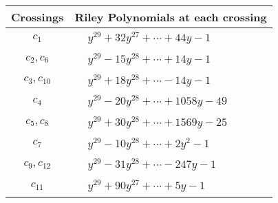 \documentclass[1p]{elsarticle_modified}
\theoremstyle{definition}
\begin{document}
\begin{tabular}{m{50pt}|m{274pt}}
Crossings & \hspace{64pt}Riley Polynomials at each crossing \\
\hline $$\begin{aligned}c_{1}\end{aligned}$$&$\begin{aligned}
&y^{29}+32 y^{27}+\cdots+44 y-1
\end{aligned}$\\
\hline $$\begin{aligned}c_{2},c_{6}\end{aligned}$$&$\begin{aligned}
&y^{29}-15 y^{28}+\cdots+14 y-1
\end{aligned}$\\
\hline $$\begin{aligned}c_{3},c_{10}\end{aligned}$$&$\begin{aligned}
&y^{29}+18 y^{28}+\cdots-14 y-1
\end{aligned}$\\
\hline $$\begin{aligned}c_{4}\end{aligned}$$&$\begin{aligned}
&y^{29}-20 y^{28}+\cdots+1058 y-49
\end{aligned}$\\
\hline $$\begin{aligned}c_{5},c_{8}\end{aligned}$$&$\begin{aligned}
&y^{29}+30 y^{28}+\cdots+1569 y-25
\end{aligned}$\\
\hline $$\begin{aligned}c_{7}\end{aligned}$$&$\begin{aligned}
&y^{29}-10 y^{28}+\cdots+2 y^2-1
\end{aligned}$\\
\hline $$\begin{aligned}c_{9},c_{12}\end{aligned}$$&$\begin{aligned}
&y^{29}-31 y^{28}+\cdots-247 y-1
\end{aligned}$\\
\hline $$\begin{aligned}c_{11}\end{aligned}$$&$\begin{aligned}
&y^{29}+90 y^{27}+\cdots+5 y-1
\end{aligned}$\\
\hline
\end{tabular}\\~\\
\end{document}
